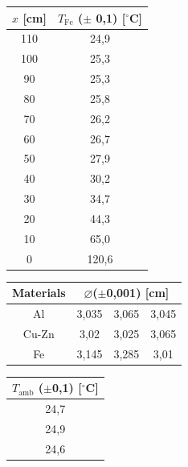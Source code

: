 \documentclass[12pt,twosides,onecolumn,openany]{article}
\newenvironment{Figura}
  {\par\medskip\noindent\minipage{\linewidth}}
  {\endminipage\par\medskip}
\begin{document}
\begin{multicols}{2}
\begin{Figura}
\begin{tabular}{c|c}
      \end{tabular}
    \end{Figura}
    \begin{Figura}
      \centering
      \begin{tabular}{c|c}
        $x$ [cm] & $T_{\text{Fe}}$ ($\pm$ 0,1) [$^\circ$C]\\\hline \hline
        110 &  24,9\\
        100 &  25,3\\
        90 &  25,3\\
        80 &  25,8\\
        70 &  26,2\\
        60 &  26,7\\
        50 &  27,9\\
        40 &  30,2\\
        30 &  34,7\\
        20 &  44,3\\
        10 &  65,0\\
        0 &  120,6\\
      \end{tabular}
    \end{Figura}
    \begin{Figura}
      \centering
      \begin{tabular}{c|ccc}
        Materials & \multicolumn{3}{c}{$\varnothing$($\pm$0,001) [cm]}\\ \hline \hline
        Al & 3,035 & 3,065 & 3,045\\
        Cu-Zn & 3,02 & 3,025 & 3,065\\
        Fe & 3,145 & 3,285 & 3,01  
      \end{tabular}
    \end{Figura}
    \begin{Figura}
      \centering
      \begin{tabular}{c}
          $T_{\text{amb}}$ ($\pm$0,1) [$^\circ$C] \\ \hline\hline
          24,7\\
          24,9\\
          24,6 
      \end{tabular}
      \label{T_ambient}
    \end{Figura}

\end{multicols}
\end{document}
